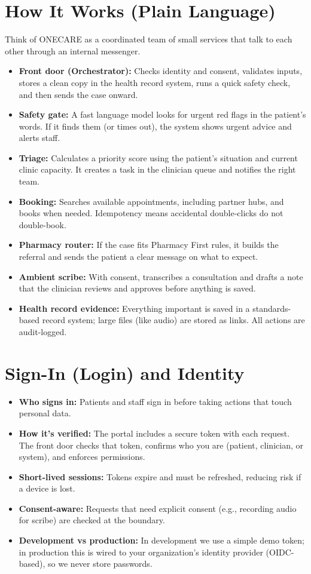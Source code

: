 \documentclass[11pt]{article}
\begin{document}
\section*{How It Works (Plain Language)}
Think of ONECARE as a coordinated team of small services that talk to each other through an internal messenger.
\begin{itemize}
  \item \textbf{Front door (Orchestrator):} Checks identity and consent, validates inputs, stores a clean copy in the health record system, runs a quick safety check, and then sends the case onward.
  \item \textbf{Safety gate:} A fast language model looks for urgent red flags in the patient's words. If it finds them (or times out), the system shows urgent advice and alerts staff.
  \item \textbf{Triage:} Calculates a priority score using the patient's situation and current clinic capacity. It creates a task in the clinician queue and notifies the right team.
  \item \textbf{Booking:} Searches available appointments, including partner hubs, and books when needed. Idempotency means accidental double-clicks do not double-book.
  \item \textbf{Pharmacy router:} If the case fits Pharmacy First rules, it builds the referral and sends the patient a clear message on what to expect.
  \item \textbf{Ambient scribe:} With consent, transcribes a consultation and drafts a note that the clinician reviews and approves before anything is saved.
  \item \textbf{Health record \/ evidence:} Everything important is saved in a standards-based record system; large files (like audio) are stored as links. All actions are audit-logged.
\end{itemize}

\section*{Sign-In (Login) and Identity}
\begin{itemize}
  \item \textbf{Who signs in:} Patients and staff sign in before taking actions that touch personal data.
  \item \textbf{How it's verified:} The portal includes a secure token with each request. The front door checks that token, confirms who you are (patient, clinician, or system), and enforces permissions.
  \item \textbf{Short-lived sessions:} Tokens expire and must be refreshed, reducing risk if a device is lost.
  \item \textbf{Consent-aware:} Requests that need explicit consent (e.g., recording audio for scribe) are checked at the boundary.
  \item \textbf{Development vs production:} In development we use a simple demo token; in production this is wired to your organization's identity provider (OIDC-based), so we never store passwords.
\end{itemize}
\end{document}
